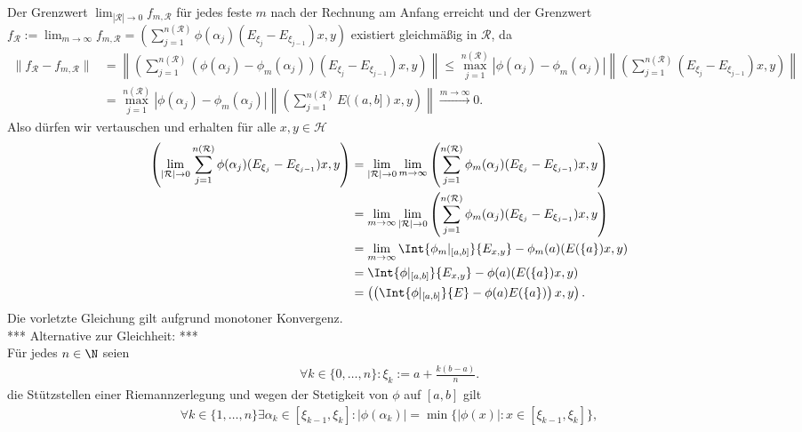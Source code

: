 \begin{solution}
\begin{align*}
\end{align*}
Der Grenzwert $\lim_{|\mathcal{R}| \to 0}f_{m,\mathcal{R}}$ für jedes feste $m$
nach der Rechnung am Anfang erreicht
und der Grenzwert $f_{\mathcal{R}} := \lim_{m \to \infty}f_{m,\mathcal{R}} =
\left(\sum_{j=1}^{n(\mathcal{R})}
\phi(\alpha_j)(E_{\xi_j} - E_{\xi_{j-1}})x,y\right)$ existiert gleichmäßig in $\mathcal{R}$, da
\begin{align*}
  \|f_{\mathcal{R}} -f_{m,\mathcal{R}}\| &=
  \left\|\left(\sum_{j=1}^{n(\mathcal{R})}
  (\phi(\alpha_j) - \phi_m(\alpha_j))(E_{\xi_j} - E_{\xi_{j-1}})x,y\right)\right\|
  \leq \max_{j=1}^{n(\mathcal{R})}|\phi(\alpha_j) - \phi_m(\alpha_j)|
  \left\|\left(\sum_{j=1}^{n(\mathcal{R})}
  (E_{\xi_j} - E_{\xi_{j-1}})x,y\right)\right\| \\
  &= \max_{j=1}^{n(\mathcal{R})}|\phi(\alpha_j) - \phi_m(\alpha_j)|
  \left\|\left(\sum_{j=1}^{n(\mathcal{R})}
  E((a,b])x,y\right)\right\| \xrightarrow{m \to \infty} 0.
\end{align*}
Also dürfen wir vertauschen und erhalten für alle $x,y \in \mathcal{H}$
\begin{align*}
  \left(\lim_{|\mathcal{R}| \to 0}\sum_{j=1}^{n(\mathcal{R})}
  \phi(\alpha_j)(E_{\xi_j} - E_{\xi_{j-1}})x,y\right) &=
  \lim_{|\mathcal{R}| \to 0}\lim_{m \to \infty}
  \left(\sum_{j=1}^{n(\mathcal{R})}
  \phi_m(\alpha_j)(E_{\xi_j} - E_{\xi_{j-1}})x,y\right) \\
  &= \lim_{m \to \infty}\lim_{|\mathcal{R}| \to 0}
  \left(\sum_{j=1}^{n(\mathcal{R})}
  \phi_m(\alpha_j)(E_{\xi_j} - E_{\xi_{j-1}})x,y\right) \\
  &= \lim_{m \to \infty} \Int{\phi_m|_{[a,b]}}{E_{x,y}} - \phi_m(a)(E(\{a\})x,y) \\
  &= \Int{\phi|_{[a,b]}}{E_{x,y}} - \phi(a)(E(\{a\})x,y) \\
  &= \left(\left(\Int{\phi|_{[a,b]}}{E} - \phi(a) E(\{a\})\right)x,y\right).
\end{align*}
Die vorletzte Gleichung gilt aufgrund monotoner Konvergenz. \\
*** Alternative zur Gleichheit: *** \\
Für jedes $n \in \N$ seien
\begin{align*}
  \forall k \in \{0, \dots, n\}: \xi_k := a + \frac{k (b - a)}{n}.
\end{align*}
die Stützstellen einer Riemannzerlegung und wegen der Stetigkeit von $\phi$ auf $[a, b]$ gilt
\begin{align*}
  \forall k \in \{1, \dots, n\} \exists \alpha_k \in [\xi_{k-1}, \xi_k]: |\phi(\alpha_k)| = \min\{|\phi(x)| : x \in [\xi_{k - 1}, \xi_k]\},

\end{align*}
\end{solution}
